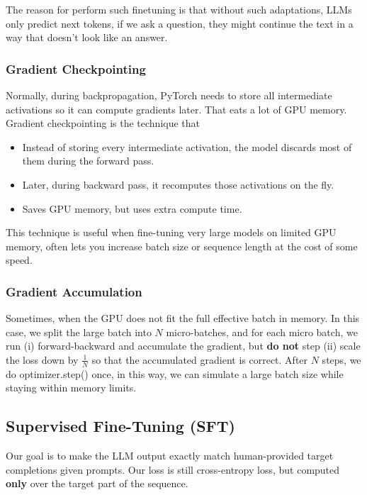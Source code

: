\documentclass[11pt]{article}  %
\begin{document}
The reason for perform such finetuning is that without such adaptations, LLMs only predict next tokens, if we ask a question, they might continue the text in a way that doesn't look like an answer.


\subsubsection{Gradient Checkpointing}
Normally, during backpropagation, PyTorch needs to store all intermediate activations so it can compute gradients later. 
That eats a lot of GPU memory.
Gradient checkpointing is the technique that 
\begin{itemize}
  \item Instead of storing every intermediate activation, the model discards most of them during the forward pass.
  \item Later, during backward pass, it recomputes those activations on the fly.
  \item Saves GPU memory, but uses extra compute time.
\end{itemize}
This technique is useful when fine-tuning very large models on limited GPU memory, often lets you increase batch size or sequence length at the cost of some speed.


\subsubsection{Gradient Accumulation}
Sometimes, when the GPU does not fit the full effective batch in memory.
In this case, we split the large batch into $N$ micro-batches, and for each micro batch, we run (i) forward-backward and accumulate the gradient, but \textbf{do not} step (ii) scale the loss down by $\frac{1}{N}$ so that the accumulated gradient is correct.
After $N$ steps, we do optimizer.step() once, in this way, we can simulate a large batch size while staying within memory limits.



\subsection{Supervised Fine-Tuning (SFT)}
Our goal is to make the LLM output exactly match human-provided target completions given prompts.
Our loss is still cross-entropy loss, but computed \textbf{only} over the target part of the sequence.
\end{document}
